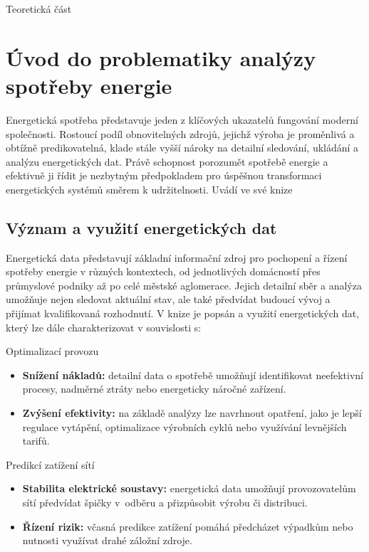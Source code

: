 Teoretická část

\chapter{Úvod do problematiky analýzy spotřeby energie}

Energetická spotřeba představuje jeden z klíčových ukazatelů fungování moderní společnosti. Rostoucí podíl obnovitelných zdrojů, 
jejichž výroba je proměnlivá a obtížně predikovatelná, klade stále vyšší nároky na detailní sledování, ukládání a analýzu energetických dat. Právě schopnost porozumět spotřebě energie a efektivně ji řídit je nezbytným předpokladem pro úspěšnou transformaci energetických systémů směrem k udržitelnosti. Uvádí ve své knize \cite{Sterner2019}

\section{Význam a využití energetických dat}

Energetická data představují základní informační zdroj pro pochopení a řízení spotřeby energie
v různých kontextech, od jednotlivých domácností přes průmyslové podniky až po celé městské
aglomerace. Jejich detailní sběr a analýza umožňuje nejen sledovat aktuální stav, ale také
předvídat budoucí vývoj a přijímat kvalifikovaná rozhodnutí. 
V knize \cite{Sterner2019} je popsán a využití energetických dat, který lze dále charakterizovat v souvislosti s:

Optimalizací provozu
\begin{itemize}
    \item \textbf{Snížení nákladů:} detailní data o spotřebě umožňují identifikovat neefektivní procesy,
    nadměrné ztráty nebo energeticky náročné zařízení.

    \item \textbf{Zvýšení efektivity:} na základě analýzy lze navrhnout opatření, jako je lepší regulace
    vytápění, optimalizace výrobních cyklů nebo využívání levnějších tarifů.
\end{itemize}

Predikcí zatížení sítí
\begin{itemize}
    \item \textbf{Stabilita elektrické soustavy:} energetická data umožňují provozovatelům sítí předvídat
    špičky v~odběru a přizpůsobit výrobu či distribuci.
    \item \textbf{Řízení rizik:} včasná predikce zatížení pomáhá předcházet výpadkům nebo nutnosti
    využívat drahé záložní zdroje.
    
\end{itemize}
\newpage

